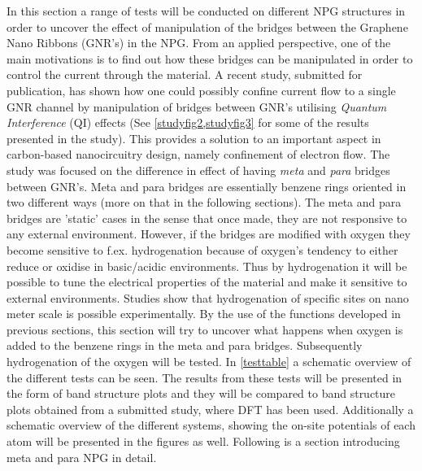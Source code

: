 In this section a range of tests will be conducted on different NPG structures in order to uncover the effect of manipulation of the bridges between the Graphene Nano Ribbons (GNR's) in the NPG. From an applied perspective, one of the main motivations is to find out how these bridges can be manipulated in order to control the current through the material. A recent study\cite{unpub}, submitted for publication, has shown how one could possibly confine current flow to a single GNR channel by manipulation of bridges between GNR's utilising \textit{Quantum Interference} (QI) effects (See \cref{studyfig2,studyfig3} for some of the results presented in the study). This provides a solution to an important aspect in carbon-based nanocircuitry design, namely confinement of electron flow. The study was focused on the difference in effect of having \textit{meta} and \textit{para} bridges between GNR's. Meta and para bridges are essentially benzene rings oriented in two different ways (more on that in the following sections). The meta and para bridges are 'static' cases in the sense that once made, they are not responsive to any external environment. However, if the bridges are modified with oxygen they become sensitive to f.ex. hydrogenation because of oxygen's tendency to either reduce or oxidise in basic/acidic environments. Thus by hydrogenation it will be possible to tune the electrical properties of the material and make it sensitive to external environments. Studies\cite{li_single_2019} show that hydrogenation of specific sites on nano meter scale is possible experimentally. By the use of the functions developed in previous sections, this section will try to uncover what happens when oxygen is added to the benzene rings in the meta and para bridges. Subsequently hydrogenation of the oxygen will be tested. In \cref{testtable} a schematic overview of the different tests can be seen. The results from these tests will be presented in the form of band structure plots and they will be compared to band structure plots obtained from a submitted study\cite{unpub}, where DFT has been used. Additionally a schematic overview of the different systems, showing the on-site potentials of each atom will be presented in the figures as well. Following is a section introducing meta and para NPG in detail.
